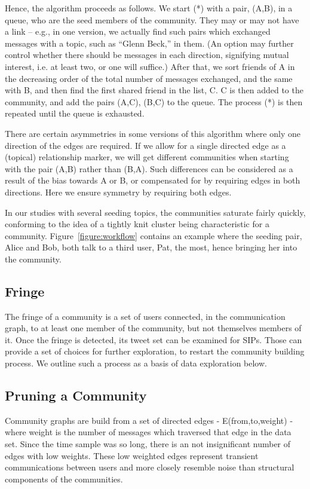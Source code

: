 Hence, the algorithm proceeds as follows.  We start (*) with a pair, (A,B), in a queue, who are the seed members of the community.  They may or may not have a link -- e.g., in one version, we actually find such pairs which exchanged messages with a topic, such as ``Glenn Beck,'' in them.  (An option may further control whether there should be messages in each direction, signifying mutual interest, i.e. at least two, or one will suffice.)  After that, we sort friends of A in the decreasing order of the total number of messages exchanged, and the same with B, and then find the first shared friend in the list, C.  C is then added to the community, and add the pairs (A,C), (B,C) to the queue.  The process (*) is then repeated until the queue is exhausted.

There are certain asymmetries in some versions of this algorithm where only one direction of the edges are required.  If we allow for a single directed edge as a (topical) relationship marker, we will get different communities when starting with the pair (A,B) rather than (B,A).  Such differences can be considered as a result of the bias towards A or B, or compensated for by requiring edges in both directions.  Here we ensure symmetry by requiring both edges.

In our studies with several seeding topics, the communities saturate fairly quickly, conforming to the idea of a tightly knit cluster \cite{DBLP:conf/waw/MishraSST07} being characteristic for a community.  Figure~\ref{figure:workflow} contains an example where the seeding pair, Alice and Bob, both talk to a third user, Pat, the most, hence bringing her into the community.

\subsection{Fringe}

The fringe of a community is a set of users connected, in the communication graph, to at least one member of the community, but not themselves members of it.  Once the fringe is detected, its tweet set can be examined for SIPs.  Those can provide a set of choices for further exploration, to restart the community building process.  We outline such a process as a basis of data exploration below.

\subsection{Pruning a Community}
Community graphs are build from a set of directed edges - E(from,to,weight) - where weight is the number of messages which traversed that edge in the data set.  Since the time sample was so long, there is an not insignificant number of edges with low weights.  These low weighted edges represent transient communications between users and more closely resemble noise than structural components of the communities.

